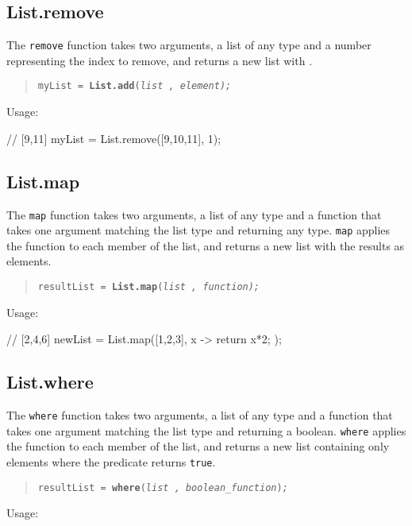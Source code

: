 \documentclass[oneside]{book}
\begin{document}
\subsection{List.remove}
The \texttt{remove} function takes two arguments, a list of any type and a number representing the index to remove, and returns a new list with .
\begin{quote}
\texttt{myList = }\texttt{\textbf{List.add}}\texttt{(}\texttt{\emph{list
, element);}}
\end{quote}
Usage:
\begin{mdframed}
[hidealllines=true,backgroundcolor=gray!10,skipbelow=.5em,skipabove=.5em]
\begin{code}
// [9,11]
myList = List.remove([9,10,11], 1);
\end{code}
\end{mdframed}

\subsection{List.map}
The \texttt{map} function takes two arguments, a list of any type and a function that takes one argument matching the list type and returning any type. \texttt{map} applies the function to each member of the list, and returns a new
list with the results as elements.
\begin{quote}
\texttt{resultList = }\texttt{\textbf{List.map}}\texttt{(}\texttt{\emph{list
, function);}}
\end{quote}
Usage:
\begin{mdframed}
[hidealllines=true,backgroundcolor=gray!10,skipbelow=.5em,skipabove=.5em]
\begin{code}
// [2,4,6]
newList = List.map([1,2,3], x -> { return x*2; });
\end{code}
\end{mdframed}

\subsection{List.where}
The \texttt{where} function takes two arguments, a list of any type and a function that takes one argument matching the list type and returning a boolean. \texttt{where} applies the function to each member of the list, and returns a new
list containing only elements where the predicate returns \texttt{true}.
\begin{quote}
\texttt{resultList = }\texttt{\textbf{where}}\texttt{(}\texttt{\emph{list
, boolean\_function}}\texttt{)}\texttt{\emph{;}}
\end{quote}
Usage:
\begin{mdframed}
[hidealllines=true,backgroundcolor=gray!10,skipbelow=.5em,skipabove=.5em]
\end{mdframed}
\end{document}

